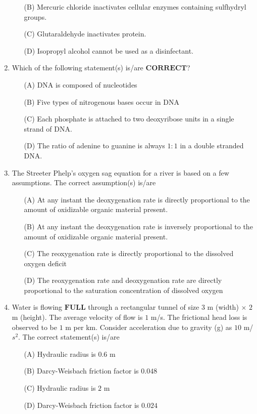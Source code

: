 \documentclass[journal]{IEEEtran}
\numberwithin{equation}{enumi}
\numberwithin{figure}{enumi}
\begin{document}
\begin{enumerate}[start=1, label={Q\arabic*.}]
\begin{itemize}
  \item[(B)] Mercuric chloride inactivates cellular enzymes containing sulfhydryl groups.
  \item[(C)] Glutaraldehyde inactivates protein.
  \item[(D)] Isopropyl alcohol cannot be used as a disinfectant.
  \end{itemize}
  \vspace{0.1cm}
\item Which of the following statement(s) is/are $\mathbf{CORRECT}$?
\begin{itemize}
  \item[(A)] DNA is composed of nucleotides
  \item[(B)] Five types of nitrogenous bases occur in DNA
  \item[(C)] Each phosphate is attached to two deoxyribose units in a single strand of DNA.
  \item[(D)] The ratio of adenine to guanine is always $1:1$ in a double stranded DNA.
  \end{itemize}
  \newpage
\item The Streeter Phelp's oxygen sag equation for a river is based on a few assumptions.
The correct assumption(s) is/are
\begin{itemize}
  \item[(A)] At any instant the deoxygenation rate is directly proportional to the amount of
oxidizable organic material present. 
  \item[(B)] At any instant the deoxygenation rate is inversely proportional to the amount of
oxidizable organic material present. 
  \item[(C)] The reoxygenation rate is directly proportional to the dissolved oxygen deficit
  \item[(D)] The reoxygenation rate and deoxygenation rate are directly proportional to the
saturation concentration of dissolved oxygen
  \end{itemize}
\item Water is flowing $\mathbf{FULL}$ through a rectangular tunnel of size $3$ m (width) \(\times\) $2$ m (height).
The average velocity of flow is $1$ m/s. The frictional head loss is observed to be $1$ m per
km. Consider acceleration due to gravity (g) as $10$ m/$s^2$. The correct statement(s) is/are
\begin{itemize}
  \item[(A)] Hydraulic radius is $0.6$ m
  \item[(B)] Darcy-Weisbach friction factor is $0.048$
  \item[(C)] Hydraulic radius is $2$ m
  \item[(D)] Darcy-Weisbach friction factor is $0.024$
  \end{itemize}


\end{enumerate}
\end{document}
